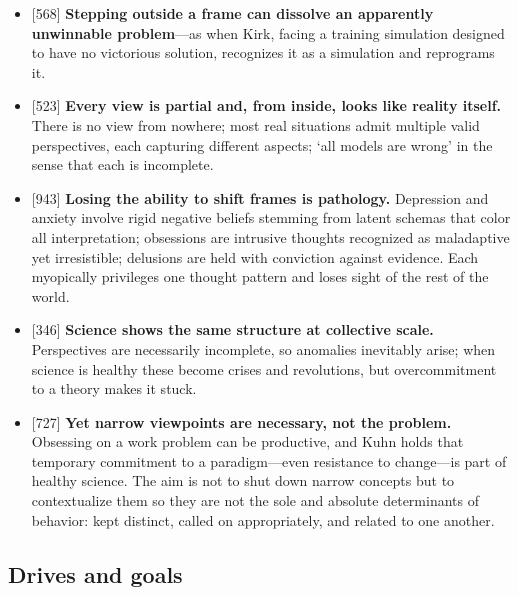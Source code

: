 \documentclass[11pt]{article}
\newcommand{\ct}[1]{{\footnotesize\color{black!55}[#1]}\hspace{1pt}}
\begin{document}
\begin{itemize}
  \item \ct{568} \textbf{Stepping outside a frame can dissolve an apparently unwinnable problem}---as when Kirk, facing a training simulation designed to have no victorious solution, recognizes it as a simulation and reprograms it.
  \item \ct{523} \textbf{Every view is partial and, from inside, looks like reality itself.} There is no view from nowhere; most real situations admit multiple valid perspectives, each capturing different aspects; `all models are wrong' in the sense that each is incomplete.
  \item \ct{943} \textbf{Losing the ability to shift frames is pathology.} Depression and anxiety involve rigid negative beliefs stemming from latent schemas that color all interpretation; obsessions are intrusive thoughts recognized as maladaptive yet irresistible; delusions are held with conviction against evidence. Each myopically privileges one thought pattern and loses sight of the rest of the world.
  \item \ct{346} \textbf{Science shows the same structure at collective scale.} Perspectives are necessarily incomplete, so anomalies inevitably arise; when science is healthy these become crises and revolutions, but overcommitment to a theory makes it stuck.
  \item \ct{727} \textbf{Yet narrow viewpoints are necessary, not the problem.} Obsessing on a work problem can be productive, and Kuhn holds that temporary commitment to a paradigm---even resistance to change---is part of healthy science. The aim is not to shut down narrow concepts but to contextualize them so they are not the sole and absolute determinants of behavior: kept distinct, called on appropriately, and related to one another.
\end{itemize}

\subsection{Drives and goals}
\end{document}
